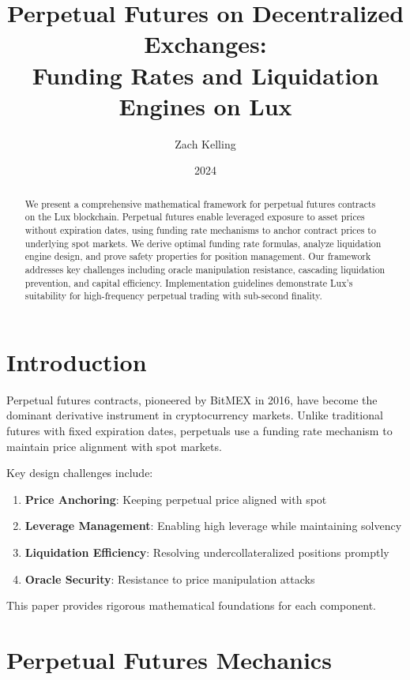 \documentclass[11pt,a4paper]{article}
\title{Perpetual Futures on Decentralized Exchanges: \\
Funding Rates and Liquidation Engines on Lux}
\author{Zach Kelling}
\affil{Hanzo Industries \\ Lux Industries \\ Zoo Labs Foundation}
\date{2024}
\theoremstyle{definition}
\begin{document}
\maketitle

\begin{abstract}
We present a comprehensive mathematical framework for perpetual futures contracts on the Lux blockchain. Perpetual futures enable leveraged exposure to asset prices without expiration dates, using funding rate mechanisms to anchor contract prices to underlying spot markets. We derive optimal funding rate formulas, analyze liquidation engine design, and prove safety properties for position management. Our framework addresses key challenges including oracle manipulation resistance, cascading liquidation prevention, and capital efficiency. Implementation guidelines demonstrate Lux's suitability for high-frequency perpetual trading with sub-second finality.
\end{abstract}

\section{Introduction}

Perpetual futures contracts, pioneered by BitMEX in 2016, have become the dominant derivative instrument in cryptocurrency markets. Unlike traditional futures with fixed expiration dates, perpetuals use a funding rate mechanism to maintain price alignment with spot markets.

Key design challenges include:

\begin{enumerate}
\item \textbf{Price Anchoring}: Keeping perpetual price aligned with spot
\item \textbf{Leverage Management}: Enabling high leverage while maintaining solvency
\item \textbf{Liquidation Efficiency}: Resolving undercollateralized positions promptly
\item \textbf{Oracle Security}: Resistance to price manipulation attacks
\end{enumerate}

This paper provides rigorous mathematical foundations for each component.

\section{Perpetual Futures Mechanics}
\end{document}
